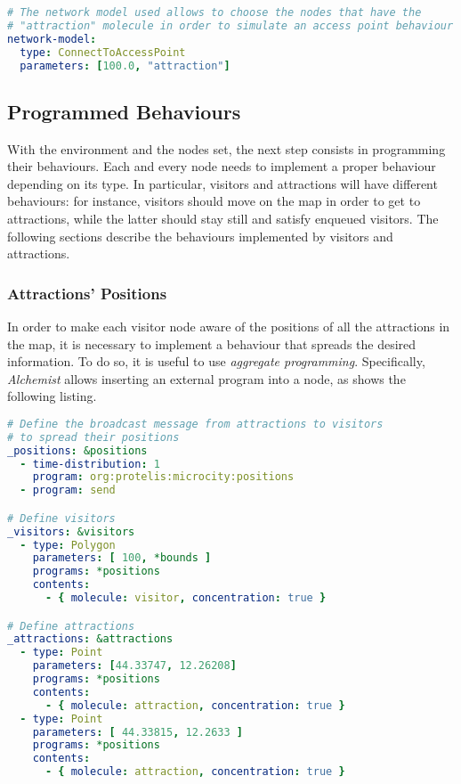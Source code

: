 \begin{lstlisting}[language=yaml, label=code:linking, caption=Defining the linking rule: only nodes with the molecule \texttt{attraction} will connect to other nodes within a radius of 100 meters.]
# The network model used allows to choose the nodes that have the
# "attraction" molecule in order to simulate an access point behaviour
network-model:
  type: ConnectToAccessPoint
  parameters: [100.0, "attraction"]
\end{lstlisting}

\subsection{Programmed Behaviours}
With the environment and the nodes set, the next step consists in programming their behaviours. Each and every node needs to implement a proper behaviour depending on its type. In particular, visitors and attractions will have different behaviours: for instance, visitors should move on the map in order to get to attractions, while the latter should stay still and satisfy enqueued visitors. The following sections describe the behaviours implemented by visitors and attractions.

\subsubsection{Attractions' Positions}
In order to make each visitor node aware of the positions of all the attractions in the map, it is necessary to implement a behaviour that spreads the desired information. To do so, it is useful to use \textit{aggregate programming}. Specifically, \textit{Alchemist} allows inserting an external program into a node, as shows the following listing.

\begin{lstlisting}[language=yaml, label=code:positions, caption=Assign the \texttt{org:protelis:microcity:positions} behaviour to 100 visitors and 2 attractions.]
# Define the broadcast message from attractions to visitors
# to spread their positions
_positions: &positions
  - time-distribution: 1
    program: org:protelis:microcity:positions
  - program: send

# Define visitors
_visitors: &visitors
  - type: Polygon
    parameters: [ 100, *bounds ]
    programs: *positions
    contents:
      - { molecule: visitor, concentration: true }

# Define attractions
_attractions: &attractions
  - type: Point
    parameters: [44.33747, 12.26208]
    programs: *positions
    contents:
      - { molecule: attraction, concentration: true }
  - type: Point
    parameters: [ 44.33815, 12.2633 ]
    programs: *positions
    contents:
      - { molecule: attraction, concentration: true }
\end{lstlisting}

